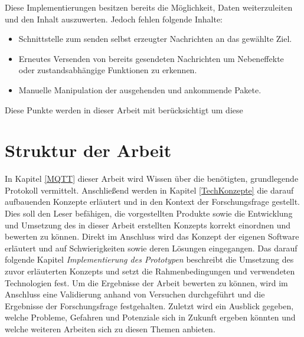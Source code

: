     Diese Implementierungen besitzen bereits die Möglichkeit, Daten weiterzuleiten und den Inhalt auszuwerten. Jedoch fehlen folgende Inhalte:
    \begin{itemize}
        \item Schnittstelle zum senden selbst erzeugter Nachrichten an das gewählte Ziel.
        \item Erneutes Versenden von bereits gesendeten Nachrichten um Nebeneffekte oder zustandsabhängige Funktionen zu erkennen.
        \item Manuelle Manipulation der ausgehenden und ankommende Pakete.
    \end{itemize}
    
    Diese Punkte werden in dieser Arbeit mit berücksichtigt um diese 

\section{Struktur der Arbeit}
    In Kapitel \ref{MQTT} dieser Arbeit wird Wissen über die benötigten, grundlegende Protokoll vermittelt.
    Anschließend werden in Kapitel \ref{TechKonzepte} die darauf aufbauenden Konzepte erläutert und in den Kontext der Forschungsfrage gestellt.
    Dies soll den Leser befähigen, die vorgestellten Produkte sowie die Entwicklung und Umsetzung des in dieser Arbeit erstellten Konzepts korrekt einordnen und bewerten zu können.
    Direkt im Anschluss wird das Konzept der eigenen Software erläutert und auf Schwierigkeiten sowie deren Lösungen eingegangen. Das darauf folgende Kapitel \emph{Implementierung des Prototypen} beschreibt die Umsetzung des zuvor erläuterten Konzepts und setzt die Rahmenbedingungen und verwendeten Technologien fest. Um die Ergebnisse der Arbeit bewerten zu können, wird im Anschluss eine Validierung anhand von Versuchen durchgeführt und die Ergebnisse der Forschungsfrage festgehalten. Zuletzt wird ein Ausblick gegeben, welche Probleme, Gefahren und Potenziale sich in Zukunft ergeben könnten und welche weiteren Arbeiten sich zu diesen Themen anbieten.
    
